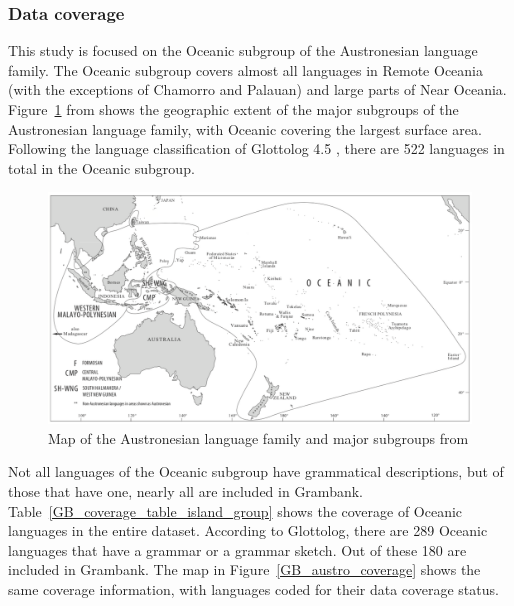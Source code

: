 \documentclass[12pt,letterpaper]{article}
\begin{document}
\FloatBarrier
\subsubsection{Data coverage} 
This study is focused on the Oceanic subgroup of the Austronesian language family. The Oceanic subgroup covers almost all languages in Remote Oceania (with the exceptions of Chamorro and Palauan) and large parts of Near Oceania. Figure~\ref{Oceanic_map} from \citet[2]{protooceanicvol5} shows the geographic extent of the major subgroups of the Austronesian language family, with Oceanic covering the largest surface area. Following the language classification of Glottolog 4.5 \citep{glottolog4_5}, there are 522 languages in total in the Oceanic subgroup.

\begin{figure}[ht]
\centering
\includegraphics[width=17cm]{illustrations/ross_pawley_osmond_protooceanic_vol5.png}
\caption{{Map of the Austronesian language family and major subgroups from \citet[2]{protooceanicvol5}}}
\label{Oceanic_map}
\end{figure} 

Not all languages of the Oceanic subgroup have grammatical descriptions, but of those that have one, nearly all are included in Grambank. Table~\ref{GB_coverage_table_island_group} shows the coverage of Oceanic languages in the entire dataset. According to Glottolog, there are 289 Oceanic languages that have a grammar or a grammar sketch. Out of these 180 are included in Grambank. The map in Figure~\ref{GB_austro_coverage} shows the same coverage information, with languages coded for their data coverage status.


\end{document}
